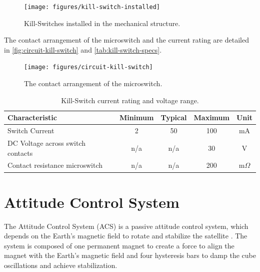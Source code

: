 \begin{figure}[!ht]
    \begin{center}
        \texttt{[image: figures/kill-switch-installed]}
        \caption{Kill-Switches installed in the mechanical structure.}
        \label{fig:kill-switch-installed}
    \end{center}
\end{figure}

The contact arrangement of the microswitch and the current rating are detailed in \autoref{fig:circuit-kill-switch} and \autoref{tab:kill-switch-specs}.

\begin{figure}[!ht]
    \begin{center}
        \texttt{[image: figures/circuit-kill-switch]}
        \caption{The contact arrangement of the microswitch.}
        \label{fig:circuit-kill-switch}
    \end{center}
\end{figure}

\begin{table}[!h]
    \centering
    \begin{tabular}{lcccc}
        \toprule[1.5pt]
        \textbf{Characteristic} & \textbf{Minimum} & \textbf{Typical} & \textbf{Maximum} & \textbf{Unit} \\
        \midrule
        Switch Current                      & 2     & 50    & 100   & mA \\
        DC Voltage across switch contacts   & n/a   & n/a   & 30    & V \\
        Contact resistance microswitch      & n/a   & n/a   & 200   & m$\Omega$ \\
        \bottomrule[1.5pt]
    \end{tabular}
    \caption{Kill-Switch current rating and voltage range.}
    \label{tab:kill-switch-specs}
\end{table}

\section{Attitude Control System}

The Attitude Control System (ACS) is a passive attitude control system, which depends on the Earth's magnetic field to rotate and stabilize the satellite \cite{santoni2009,gerhardt2010}. The system is composed of one permanent magnet to create a force to align the magnet with the Earth's magnetic field and four hysteresis bars to damp the cube oscillations and achieve stabilization.

